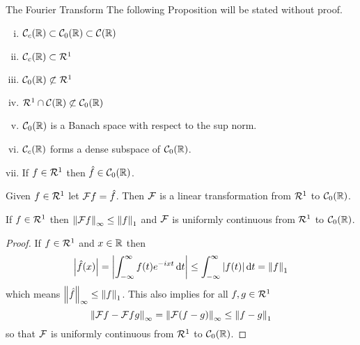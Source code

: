 \begin{section}{The Fourier Transform}
	The following Proposition will be stated without proof.
	
\begin{prop}
	\begin{enumerate}[i)]
		\item
			$\ctscompact \subset \ctszeror \subset \ctsr$
		\item
			$\ctscompact \subset \absint$
		\item
			$\ctszeror \not \subset \absint$
		\item
			$\absint \cap \ctsr \not \subset \ctszeror$
		\item
			$\ctszeror$ is a Banach space with respect to the
			sup norm.
		\item
			$\ctscompact$ forms a dense subspace of $\ctszeror$.
		\item
			If $f \in \absint$ then $\f \in \ctszeror$.
	\end{enumerate}
\end{prop}


\begin{defn}
	Given $f \in \absint$ let $\ftransform=\f$. Then
	$\ftransform[]$ is a linear transformation from $\absint$
	to $\ctszeror$.
\end{defn}

\begin{prop}\label{prop:FTransform}
	If $f \in \absint$ then $\supnorm{\ftransform}
	\leq \norm[1]{f}$ and $\ftransform[]$ is uniformly
	continuous from $\absint$ to $\ctszeror$.
\end{prop}

\begin{proof}
	If $f \in \absint$ and $\isreal$ then
		\begin{displaymath}
			\modulus{\f(x)} = \modulus{
				\myintb{f(t)e^{-ixt}}{t}}
				\leq \myintb{\modulus{f(t)}}{t}
				= \norm[1]{f}
		\end{displaymath}
	which means $\supnorm{\f} \leq \norm[1]{f}$.
	This also implies for all $f,g \in \absint$
		\begin{displaymath}
			\supnorm{\ftransform-\ftransform{g}}
			= \supnorm{\ftransform[(f-g)]}
			\leq \norm[1]{f-g}
		\end{displaymath}
	so that $\ftransform[]$ is uniformly continuous from
	$\absint$ to $\ctszeror$.
\end{proof}


\end{section}
